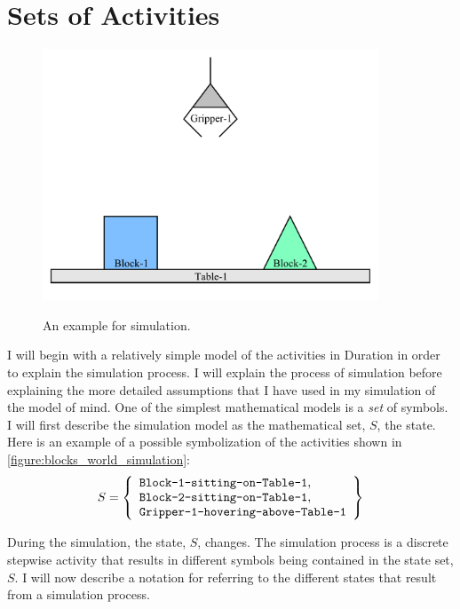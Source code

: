 \section{Sets of Activities}

\begin{figure}[bth]
\includegraphics[width=10cm]{gfx/blocks_world_simulation} \\ \medskip
\caption{An example for simulation.}
\label{figure:blocks_world_simulation}
\end{figure}

I will begin with a relatively simple model of the activities in
Duration in order to explain the simulation process.  I will explain
the process of simulation before explaining the more detailed
assumptions that I have used in my simulation of the model of mind.
One of the simplest mathematical models is a \emph{set} of symbols.  I
will first describe the simulation model as the mathematical set, $S$,
the state.  Here is an example of a possible symbolization of the
activities shown in \autoref{figure:blocks_world_simulation}:
\begin{equation}
\label{equation:example_initial_state}
S = \left\{
      \begin{array}{l}
        \text{{\tt Block-1-sitting-on-Table-1}}, \\
        \text{{\tt Block-2-sitting-on-Table-1}}, \\
        \text{{\tt Gripper-1-hovering-above-Table-1}}\\
      \end{array}
    \right\}
\end{equation}

During the simulation, the state, $S$, changes.  The simulation
process is a discrete stepwise activity that results in different
symbols being contained in the state set, $S$.  I will now describe a
notation for referring to the different states that result from a
simulation process.

